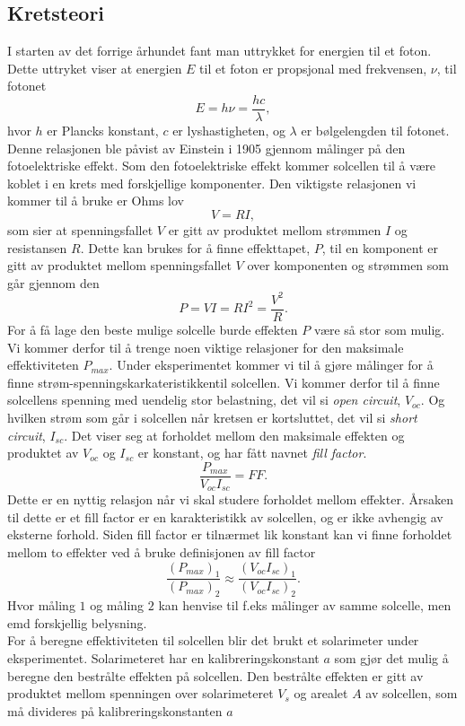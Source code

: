 \documentclass[%
 reprint,
 amsmath,amssymb,
 aps,
 norsk,
 booktabs
]{revtex4-1}
\begin{document}
\subsection{Kretsteori}
I starten av det forrige århundet fant man uttrykket for energien til et foton. Dette uttryket viser at energien $E$ til et foton er propsjonal med frekvensen, $\nu$, til fotonet
\begin{equation}
  E = h\nu = \frac{hc}{\lambda} \label{einstein},
\end{equation}hvor $h$ er Plancks konstant, $c$ er lyshastigheten, og $\lambda$ er bølgelengden til fotonet. Denne relasjonen ble påvist av Einstein i 1905 gjennom målinger på den fotoelektriske effekt. Som den fotoelektriske effekt kommer solcellen til å være koblet i en krets med forskjellige komponenter. Den viktigste relasjonen vi kommer til å bruke er Ohms lov
\begin{equation}
  V = RI,
\end{equation}som sier at spenningsfallet $V$ er gitt av produktet mellom strømmen $I$ og resistansen $R$. Dette kan brukes for å finne effekttapet, $P$, til en komponent er gitt av produktet mellom spenningsfallet $V$ over komponenten og strømmen som går gjennom den
\begin{equation}
  P = VI = RI^2 = \frac{V^2}{R} \label{effekt1}.
\end{equation}For å få lage den beste mulige solcelle burde effekten $P$ være så stor som mulig. Vi kommer derfor til å trenge noen viktige relasjoner for den maksimale effektiviteten $P_{max}$. Under eksperimentet kommer vi til å gjøre målinger for å finne strøm-spenningskarkateristikkentil solcellen. Vi kommer derfor til å finne solcellens spenning med uendelig stor belastning, det vil si \textit{open circuit}, $V_{oc}$. Og hvilken strøm som går i solcellen når kretsen er kortsluttet, det vil si \textit{short circuit}, $I_{sc}$. Det viser seg at forholdet mellom den maksimale effekten og produktet av $V_{oc}$ og $I_{sc}$ er konstant, og har fått navnet \textit{fill factor}.
\begin{equation}
  \frac{P_{max}}{V_{oc}I_{sc}} = FF. \label{ff}
\end{equation}Dette er en nyttig relasjon når vi skal studere forholdet mellom effekter. Årsaken til dette er et fill factor er en karakteristikk av solcellen, og er ikke avhengig av eksterne forhold. Siden fill factor er tilnærmet lik konstant kan vi finne forholdet mellom to effekter ved å bruke definisjonen av fill factor
\begin{equation}
  \frac{\left(P_{max}\right)_1}{\left(P_{max}\right)_2} \approx \frac{\left(V_{oc}I_{sc}\right)_1}{\left(V_{oc}I_{sc}\right)_2}. \label{maxP}
\end{equation}Hvor måling $1$ og måling $2$ kan henvise til f.eks målinger av samme solcelle, men emd forskjellig belysning.\\For å beregne effektiviteten til solcellen blir det brukt et solarimeter under eksperimentet. Solarimeteret har en kalibreringskonstant $a$ som gjør det mulig å beregne den bestrålte effekten på solcellen. Den bestrålte effekten er gitt av produktet mellom spenningen over solarimeteret $V_s$ og arealet $A$ av solcellen, som må divideres på kalibreringskonstanten $a$
\end{document}
